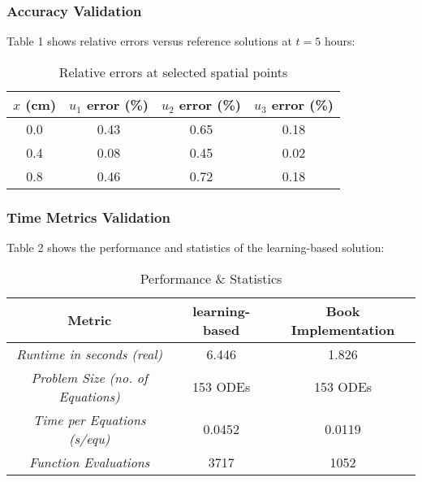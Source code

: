 \documentclass[conference]{IEEEtran}
\begin{document}
\subsubsection{Accuracy Validation}
Table 1 shows relative errors versus reference solutions at $t=5$ hours:

\begin{table}[H]
\centering
\caption{Relative errors at selected spatial points}
\begin{tabular}{|c|c|c|c|}
\hline
$x$ (cm) & $u_1$ error (\%) & $u_2$ error (\%) & $u_3$ error (\%) \\
\hline
0.0 & 0.43 & 0.65 & 0.18 \\
0.4 & 0.08 & 0.45 & 0.02 \\
0.8 & 0.46 & 0.72 & 0.18 \\
\hline
\end{tabular}
\end{table}

\subsubsection{Time Metrics Validation}
Table 2 shows the performance and statistics of the learning-based solution:

\begin{table}[H]
\centering
\caption{Performance \& Statistics}
\begin{tabular}{|c|c|c|}
\hline
Metric & learning-based & Book Implementation \\
\hline
\textit{Runtime in seconds (real)} & 6.446 & 1.826 \\
\textit{Problem Size (no. of Equations)} & 153 ODEs & 153 ODEs \\
\textit{Time per Equations (s/equ)} & 0.0452 & 0.0119 \\
\textit{Function Evaluations} & 3717 & 1052 \\
\hline
\end{tabular}
\end{table}
\end{document}
